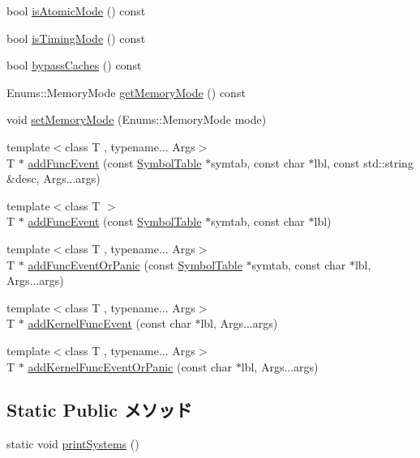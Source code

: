 \begin{Indent}{\bf }\par
{\em \label{_amgrpd41d8cd98f00b204e9800998ecf8427e}
 }\begin{DoxyCompactItemize}
\item 
bool \hyperlink{classSystem_a6685592df58820e9bb30d94908c9881a}{isAtomicMode} () const 
\item 
bool \hyperlink{classSystem_ae04bdd25f4dde1cc1b58b22505aa869c}{isTimingMode} () const 
\item 
bool \hyperlink{classSystem_a613d9d917b0e950cd322026de403d702}{bypassCaches} () const 
\item 
Enums::MemoryMode \hyperlink{classSystem_a1a43e0888d498acd3b15fcbd678998d6}{getMemoryMode} () const 
\item 
void \hyperlink{classSystem_ae0c4408279fbea962460bccd251cffe5}{setMemoryMode} (Enums::MemoryMode mode)
\item 
{\footnotesize template$<$class T , typename... Args$>$ }\\T $\ast$ \hyperlink{classSystem_a35e24b9d75d9b23f195b383672965a24}{addFuncEvent} (const \hyperlink{classSymbolTable}{SymbolTable} $\ast$symtab, const char $\ast$lbl, const std::string \&desc, Args...args)
\item 
{\footnotesize template$<$class T $>$ }\\T $\ast$ \hyperlink{classSystem_a651f66880621119f2d0ab293788c01c4}{addFuncEvent} (const \hyperlink{classSymbolTable}{SymbolTable} $\ast$symtab, const char $\ast$lbl)
\item 
{\footnotesize template$<$class T , typename... Args$>$ }\\T $\ast$ \hyperlink{classSystem_a299ade3c625c503681f9b0f7a3812075}{addFuncEventOrPanic} (const \hyperlink{classSymbolTable}{SymbolTable} $\ast$symtab, const char $\ast$lbl, Args...args)
\item 
{\footnotesize template$<$class T , typename... Args$>$ }\\T $\ast$ \hyperlink{classSystem_a87294b0dc6aa3e647f45e44a064269fb}{addKernelFuncEvent} (const char $\ast$lbl, Args...args)
\item 
{\footnotesize template$<$class T , typename... Args$>$ }\\T $\ast$ \hyperlink{classSystem_a627f7dd0edc7fbe7567d4c2a1bf340c4}{addKernelFuncEventOrPanic} (const char $\ast$lbl, Args...args)
\end{DoxyCompactItemize}
\end{Indent}
\subsection*{Static Public メソッド}
\begin{DoxyCompactItemize}
\item 
static void \hyperlink{classSystem_a55206d1ab112cc51ccc3bbefdcc5b923}{printSystems} ()
\end{DoxyCompactItemize}
